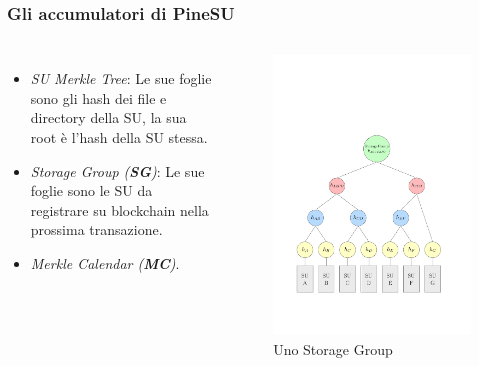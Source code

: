 \documentclass{beamer}
\begin{document}
\begin{frame}
	\frametitle{Gli accumulatori di PineSU}
	\begin{columns}
		\begin{itemize}
			\item \emph{SU Merkle Tree}: Le sue foglie sono gli hash dei file e directory della SU, la sua root è l'hash della SU stessa. 
			\item \emph{Storage Group (\textbf{SG})}: Le sue foglie sono le SU da registrare su blockchain nella prossima transazione. 
			\item \emph{Merkle Calendar (\textbf{MC})}.
		\end{itemize}
		\centering
		\begin{figure}
			\includegraphics[width=\textwidth]{figures/sg1.pdf}
			\caption{Uno Storage Group}
		\end{figure} 
	\end{columns}
\end{frame}
\end{document}
